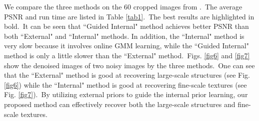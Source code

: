 We compare the three methods on the 60 cropped images from \cite{crosschannel2016}.\ The average PSNR and run time are listed in Table \ref{tab1}.\ The best results are highlighted in bold.\ It can be seen that ``Guided Internal" method achieves better PSNR than both ``External" and ``Internal" methods. In addition, the ``Internal" method is very slow because it involves online GMM learning, while the ``Guided Internal" method is only a little slower than the ``External" method.\ Figs. \ref{fig6} and \ref{fig7} show the denoised images of two noisy images by the three methods.\ One can see that the  ``External" method is good at recovering large-scale structures (see Fig. \ref{fig6}) while the ``Internal" method is good at recovering fine-scale textures (see Fig. \ref{fig7}).\ By utilizing external priors to guide the internal prior learning, our proposed method can effectively recover both the large-scale structures and fine-scale textures. 

